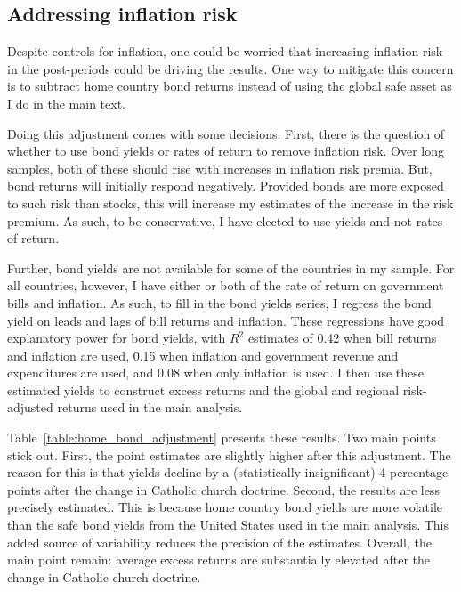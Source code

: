 \documentclass[12pt]{article}
\numberwithin{equation}{section}
\begin{document}
\subsection{Addressing inflation risk}\label{section:did_inflation_risk}

Despite controls for inflation, one could be worried that increasing inflation risk in the post-periods could be driving the results.  One way to mitigate this concern is to subtract home country bond returns instead of using the global safe asset as I do in the main text.

Doing this adjustment comes with some decisions. First, there is the question of whether to use bond yields or rates of return to remove inflation risk. Over long samples, both of these should rise with increases in inflation risk premia. But, bond returns will initially respond negatively. Provided bonds are more exposed to such risk than stocks, this will increase my estimates of the increase in the risk premium. As such, to be conservative, I have elected to use yields and not rates of return.

Further, bond yields are not available for some of the countries in my sample. For all countries, however, I have either or both of the rate of return on government bills and inflation. As such, to fill in the bond yields series, I regress the bond yield on leads and lags of bill returns and inflation.  These regressions have good explanatory power for bond yields, with $R^2$ estimates of 0.42 when bill returns and inflation are used,  0.15 when inflation and government revenue and expenditures are used, and 0.08 when only inflation is used. I then use these estimated yields to construct excess returns and the global and regional risk-adjusted returns used in the main analysis.

Table~\ref{table:home_bond_adjustment} presents these results. Two main points stick out. First, the point estimates are slightly higher after this adjustment. The reason for this is that yields decline by a (statistically insignificant) 4 percentage points after the change in Catholic church doctrine. Second, the results are less precisely estimated. This is because home country bond yields are more volatile than the safe bond yields from the United States used in the main analysis. This added source of variability reduces the precision of the estimates. Overall, the main point remain: average excess returns are substantially elevated after the change in Catholic church doctrine.
\end{document}
